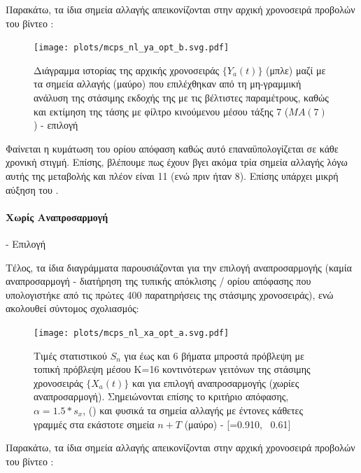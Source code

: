 Παρακάτω, τα ίδια σημεία αλλαγής απεικονίζονται στην αρχική χρονοσειρά προβολών του βίντεο :

\begin{figure}[H]
    \begin{center}
        \texttt{[image: plots/mcps\_nl\_ya\_opt\_b.svg.pdf]}
        \caption{Διάγραμμα ιστορίας της αρχικής χρονοσειράς $\{Y_a(t)\}$ (μπλε) μαζί με τα σημεία αλλαγής (μαύρο) που επιλέχθηκαν από τη μη-γραμμική ανάλυση της στάσιμης εκδοχής της με τις βέλτιστες παραμέτρους, καθώς και εκτίμηση της τάσης με φίλτρο κινούμενου μέσου τάξης 7 ($MA(7)$ ) - επιλογή }
        \label{fig:mcps_nl_ya_opt_b}
    \end{center}
\end{figure}

Φαίνεται η κυμάτωση του ορίου απόφαση καθώς αυτό επαναϋπολογίζεται σε κάθε χρονική στιγμή. Επίσης, βλέπουμε πως έχουν βγει ακόμα τρία σημεία αλλαγής λόγω αυτής της μεταβολής και πλέον είναι 11 (ενώ πριν ήταν 8). Επίσης υπάρχει μικρή αύξηση του .

\paragraph{Χωρίς Αναπροσαρμογή}- Επιλογή 

Τέλος, τα ίδια διαγράμματα παρουσιάζονται για την επιλογή αναπροσαρμογής  (καμία αναπροσαρμογή - διατήρηση της τυπικής απόκλισης / ορίου απόφασης που υπολογιστήκε από τις πρώτες 400 παρατηρήσεις της στάσιμης χρονοσειράς), ενώ ακολουθεί σύντομος σχολιασμός:

\begin{figure}[H]
    \begin{center}
        \texttt{[image: plots/mcps\_nl\_xa\_opt\_a.svg.pdf]}
        \caption{Τιμές στατιστικού $S_n$ για έως και 6 βήματα μπροστά πρόβλεψη με τοπική πρόβλεψη μέσου Κ=16 κοντινότερων γειτόνων της στάσιμης χρονοσειράς $\{X_a(t)\}$ και για επιλογή αναπροσαρμογής  (χωρίες αναπροσαρμογή). Σημειώνονται επίσης το κριτήριο απόφασης, $\alpha=1.5*s_x$, () και φυσικά τα σημεία αλλαγής με έντονες κάθετες γραμμές στα εκάστοτε σημεία $n+T$ (μαύρο) - [=0.910, \ 0.61]}
        \label{fig:mcps_nl_xa_opt_a}
    \end{center}
\end{figure}

Παρακάτω, τα ίδια σημεία αλλαγής απεικονίζονται στην αρχική χρονοσειρά προβολών του βίντεο :

